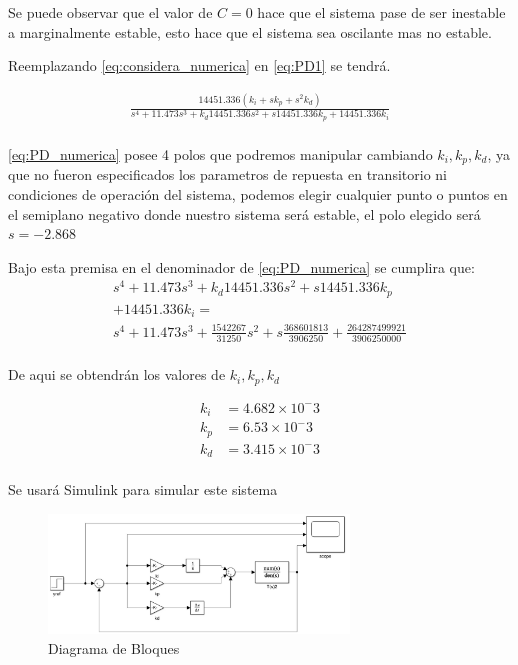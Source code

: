 \documentclass[a4paper]{IEEEtran} %
\begin{document}
Se puede observar que el valor de $C=0$ hace que el sistema pase de ser inestable a marginalmente estable, esto hace que el sistema sea oscilante mas no estable.

Reemplazando \ref{eq:considera_numerica} en \ref{eq:PD1} se tendrá.

\begin{equation}
    \begin{split}
        \frac{14451.336(k_{i}+sk_{p}+s^2k_{d})}{s^4+11.473s^3+k_{d}14451.336s^2+s14451.336k_{p}+14451.336k_{i}}\\
    \end{split}
    \label{eq:PD_numerica}
\end{equation}

\ref{eq:PD_numerica} posee 4 polos que podremos manipular cambiando $k_{i},k_{p},k_{d}$, ya que no fueron especificados los parametros de repuesta en transitorio ni condiciones de operación del sistema, podemos elegir cualquier punto o puntos en el semiplano negativo donde nuestro sistema será estable, el polo elegido será $s=-2.868$ 

Bajo esta premisa en el denominador de \ref{eq:PD_numerica} se cumplira que:
\begin{equation}
    \begin{split}
        s^4+11.473s^3+k_{d}14451.336s^2+s14451.336k_{p}\\+14451.336k_{i}=\\s^4+11.473s^3+\frac{1542267}{31250}s^2+s\frac{368601813}{3906250}+\frac{264287499921}{3906250000}\\
    \end{split}
    \label{eq:PD_numerica1}
\end{equation}

De aqui se obtendrán los valores de $k_{i},k_{p},k_{d}$

\begin{equation}
    \begin{split}
        k_{i}&=4.682\times 10^-3\\
        k_{p}&=6.53\times 10^-3\\
        k_{d}&=3.415\times 10^-3\\
    \end{split}
    \label{eq:vieta}
\end{equation}

Se usará Simulink para simular este sistema
\begin{figure}[h]
    \centering
        \includegraphics[width=8cm]{images/8}
        \caption{Diagrama de Bloques}
        \label{fig:simu}
\end{figure}
\vspace{100mm}
\end{document}
